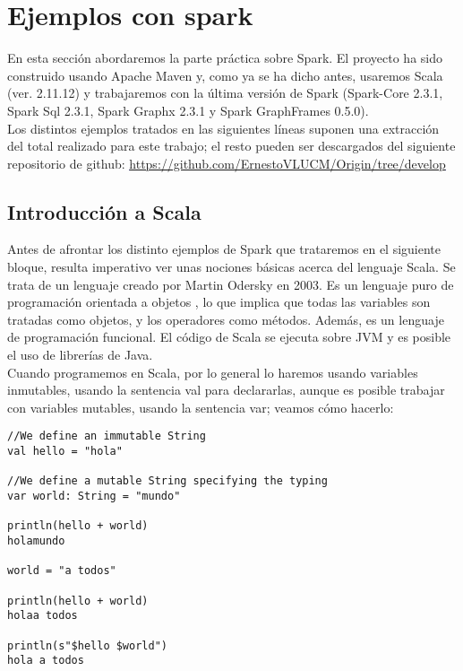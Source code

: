 \chapter{Ejemplos con spark}

En esta sección abordaremos la parte práctica sobre Spark. El proyecto ha sido construido usando Apache Maven y, como ya se ha dicho antes, usaremos Scala (ver. 2.11.12) y trabajaremos con la última versión de Spark (Spark-Core 2.3.1, Spark Sql 2.3.1, Spark Graphx 2.3.1 y Spark GraphFrames 0.5.0).\\

Los distintos ejemplos tratados en las siguientes líneas suponen una extracción del total realizado para este trabajo; el resto pueden ser descargados del siguiente repositorio de  github: \textcolor{blue}{\underline{\url{https://github.com/ErnestoVLUCM/Origin/tree/develop}}} 

\section{Introducción a Scala}

Antes de afrontar los distinto ejemplos de Spark que trataremos en el siguiente bloque, resulta imperativo ver unas nociones básicas acerca del lenguaje Scala. Se trata de un lenguaje creado por Martin Odersky en 2003. Es un lenguaje puro de programación orientada a objetos \cite{scalaCoockbook}, lo que implica que todas las variables son tratadas como objetos, y los operadores como métodos. Además, es un lenguaje de programación funcional. El código de Scala se ejecuta sobre JVM y es posible el uso de librerías de Java.\\

Cuando programemos en Scala, por lo general lo haremos usando variables inmutables, usando la sentencia val para declararlas, aunque es posible trabajar con variables mutables, usando la sentencia var; veamos cómo hacerlo:\\

\begin{lstlisting}[frame=single]
//We define an immutable String
val hello = "hola"

//We define a mutable String specifying the typing
var world: String = "mundo"

println(hello + world)
holamundo

world = "a todos"

println(hello + world)
holaa todos

println(s"$hello $world")
hola a todos
\end{lstlisting}

